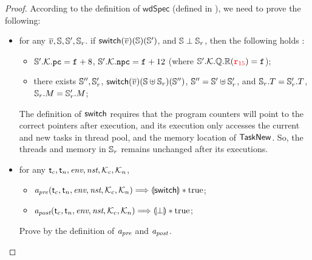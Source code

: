 \begin{proof}
    According to the definition of 
    $\textsf{wdSpec}$ (defined in 
    \Def{\ref{def:well-defined specification}}), 
    we need to prove the following:
    \begin{itemize}
        \item for any $\overline{v}, \mathbb{S}, \mathbb{S}', \mathbb{S}_r$. 
        if $\mathsf{switch}(\overline{v})(\mathbb{S})(\mathbb{S}')$, and 
        $\mathbb{S} \perp \mathbb{S}_r$, 
        then the following holds : 
        \begin{itemize}
            \small
            \item $\mathbb{S}'.\mathcal{K}.\texttt{pc} = \texttt{f}_{} + 8$, 
                $\mathbb{S}'.\mathcal{K}.\texttt{npc} = \texttt{f}_{} + 12$
                (where $\mathbb{S}'.\mathcal{K}.\mathbb{Q}.\mathbb{R}
                    ({\color{red} \texttt{r}_{15}}) = \texttt{f}_{}$);
            \item there exists $\mathbb{S}'', \mathbb{S}_r'$, 
                $\mathsf{switch}(\overline{v})(\mathbb{S} \uplus \mathbb{S}_r) 
                    (\mathbb{S}'')$, $\mathbb{S}'' = \mathbb{S}' \uplus \mathbb{S}_r'$, 
                and $\mathbb{S}_r.T = \mathbb{S}_r'.T$, 
                $\mathbb{S}_r.M = \mathbb{S}_r'.M$; 
        \end{itemize}

        The definition of $\mathsf{switch}$ requires that the 
        program counters will point to the correct pointers 
        after execution, and its execution 
        only accesses the current and new tasks in thread pool, 
        and the memory location of $\mathsf{TaskNew}$. 
        So, the threads and memory in $\mathbb{S}_r$ 
        remains unchanged after its executions. 

        \item for any $\textsf{t}_c, \textsf{t}_n, \textit{env}, \textit{nst}, \mathcal{K}_c, \mathcal{K}_n$,
            \begin{itemize}
                \small
                \item $\textit{a}_\textit{pre}(\textsf{t}_c, \textsf{t}_n, \textit{env}, \textit{nst}, \mathcal{K}_c, \mathcal{K}_n) 
                    \Longrightarrow \llparenthesis {\mathsf{switch}} \rrparenthesis * \text{true}$; 
                \item $\textit{a}_\textit{post}(\textsf{t}_c, \textsf{t}_n, \textit{env}, \textit{nst}, \mathcal{K}_c, \mathcal{K}_n) 
                    \Longrightarrow \llparenthesis {\perp} \rrparenthesis * \text{true}$; 
            \end{itemize}   
        \vspace*{0.3em}
        Prove by the definition of $\textit{a}_\textit{pre}$ and $\textit{a}_\textit{post}$.


\end{itemize}
\end{proof}
